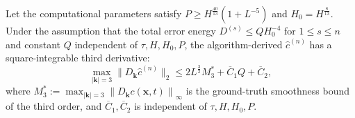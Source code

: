 \documentclass[review,onefignum,onetabnum]{siamart250211}
\begin{document}
\begin{lemma}
\label{lemma:c_hat_2norm_reg}
Let the computational parameters satisfy \( P \geq H^{\frac{40}{13}}(1+L^{-5}) \) and \( H_0 = H^{\frac{8}{13}} \). Under the assumption that the total error energy \(D^{(s)} \leq Q H_0^{-4}\) for \(1 \leq s \leq n\) and constant $Q$ independent of \(\tau,H,H_0,P\), the algorithm-derived \(\hat{c}^{(n)}\) has a square-integrable third derivative:
\begin{equation}
\max_{|\mathbf{k}|= 3}\| D_{\mathbf{k}} \hat{c}^{(n)} \|_2 \leq 2L^\frac{3}{2}M_3^*+\overline{C}_1Q+\overline{C}_2,
\end{equation}
where $M_3^* := \max_{|\mathbf{k}|= 3}
\left\|D_{\mathbf{k}}c(\mathbf{x},t)\right\|_\infty$ is the ground-truth smoothness bound of the third order, and $\overline{C}_1,\overline{C}_2$ is independent of \(\tau,H,H_0,P\).
\end{lemma}
\end{document}
